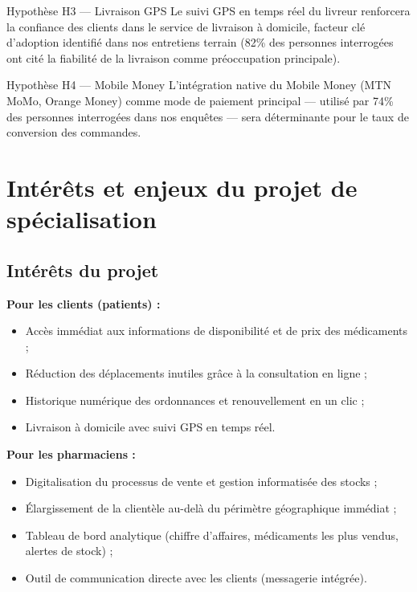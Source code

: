 \documentclass[12pt,a4paper,oneside]{report}
\begin{document}
\begin{hypothese}{Hypothèse H3 — Livraison GPS}
Le suivi GPS en temps réel du livreur renforcera la confiance des clients dans le service de livraison à domicile, facteur clé d'adoption identifié dans nos entretiens terrain (82\% des personnes interrogées ont cité la fiabilité de la livraison comme préoccupation principale).
\end{hypothese}

\begin{hypothese}{Hypothèse H4 — Mobile Money}
L'intégration native du Mobile Money (MTN MoMo, Orange Money) comme mode de paiement principal — utilisé par 74\% des personnes interrogées dans nos enquêtes — sera déterminante pour le taux de conversion des commandes.
\end{hypothese}

\section{Intérêts et enjeux du projet de spécialisation}

\subsection{Intérêts du projet}

\textbf{Pour les clients (patients) :}
\begin{itemize}
  \item Accès immédiat aux informations de disponibilité et de prix des médicaments ;
  \item Réduction des déplacements inutiles grâce à la consultation en ligne ;
  \item Historique numérique des ordonnances et renouvellement en un clic ;
  \item Livraison à domicile avec suivi GPS en temps réel.
\end{itemize}

\textbf{Pour les pharmaciens :}
\begin{itemize}
  \item Digitalisation du processus de vente et gestion informatisée des stocks ;
  \item Élargissement de la clientèle au-delà du périmètre géographique immédiat ;
  \item Tableau de bord analytique (chiffre d'affaires, médicaments les plus vendus, alertes de stock) ;
  \item Outil de communication directe avec les clients (messagerie intégrée).
\end{itemize}
\end{document}
